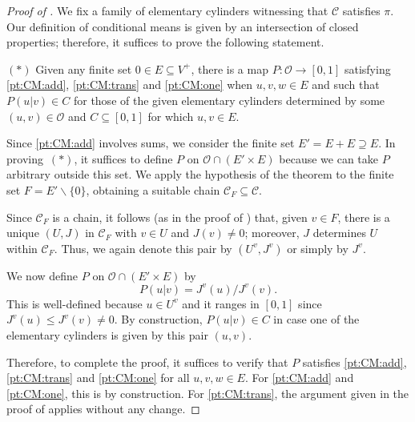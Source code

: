 \documentclass[11pt]{amsart}
\numberwithin{equation}{section}
\theoremstyle{definition}
\theoremstyle{definition}
\newcommand*{\sC}{\mathscr{C}}
\newcommand*{\sO}{\mathscr{O}}
\newcommand*{\se}{\subseteq}
\begin{document}
\begin{proof}[Proof of ]
We fix a family of elementary cylinders witnessing that $\sC$ satisfies $\pi$. Our definition of conditional means is given by an intersection of closed properties; therefore, it suffices to prove the following statement.

$(*)$ Given any finite set $0\in E\se V^+$, there is a map $P\colon \sO \to [0, 1]$ satisfying \ref{pt:CM:add}, \ref{pt:CM:trans} and \ref{pt:CM:one} when $u,v,w\in E$ and such that $P(u|v)\in C$ for those of the given elementary cylinders determined by some $(u, v)\in \sO$ and $C\se [0, 1]$ for which $u, v\in E$.

\smallskip

Since \ref{pt:CM:add} involves sums, we consider the finite set $E'= E+E \supseteq E$. In proving~$(*)$, it suffices to define $P$ on $\sO  \cap (E'\times E)$ because we can take $P$ arbitrary outside this set. We apply the hypothesis of the theorem to the finite set $F = E' \smallsetminus\{0\}$, obtaining a suitable chain $\sC_F \se \sC$.

Since $\sC_F$ is a chain, it follows (as in the proof of ) that, given $v\in F$, there is a unique $(U, J)$ in $\sC_F$ with $v\in U$ and $J(v) \neq 0$; moreover, $J$ determines $U$ within $\sC_F$. Thus, we again denote this pair by $(U^v, J^v)$ or simply by $J^v$.


We now define $P$ on $\sO  \cap (E'\times E)$ by
\begin{equation*}
P(u|v) = J^v(u) / J^v(v).
\end{equation*}
This is well-defined because $u\in U^v$ and it ranges in $[0, 1]$ since $J^v(u) \leq J^v(v)\neq 0$. By construction, $P(u|v)\in C$ in case one of the elementary cylinders is given by this pair $(u,v)$.

Therefore, to complete the proof, it suffices to verify that $P$ satisfies \ref{pt:CM:add}, \ref{pt:CM:trans} and \ref{pt:CM:one} for all $u,v,w\in E$.  For \ref{pt:CM:add} and \ref{pt:CM:one}, this is by construction. For \ref{pt:CM:trans}, the argument given in the proof of  applies without any change.
\end{proof}


\end{document}
